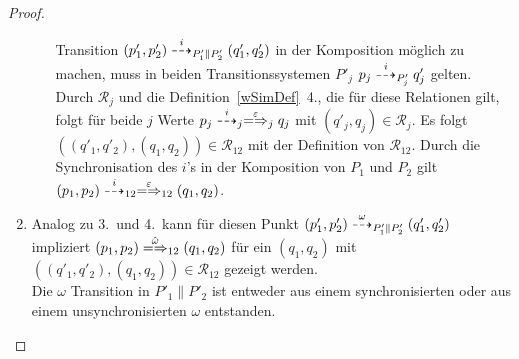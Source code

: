 \begin{proof}
\begin{enumerate}
\begin{itemize}
          Transition $(p'_1,p'_2)\may[i]_{P'_1\|P'_2}(q'_1,q'_2)$ in der
          Komposition möglich zu machen, muss in beiden Transitionssystemen
          $P'_j$ $p_j \may[i]_{P'_j} q'_j$ gelten. Durch $\mathcal{R}_j$ und
          die Definition~\ref{wSimDef}~4., die für diese Relationen gilt, folgt
          für beide $j$ Werte $p_j\may[i]_j \weakmay[\varepsilon]_j q_j$ mit
          $(q'_j,q_j)\in\mathcal{R}_j$. Es folgt $((q'_1,q'_2),(q_1,q_2)) \in
          \mathcal{R}_{12}$ mit der Definition von $\mathcal{R}_{12}$. Durch
          die Synchronisation des $i$'s in der Komposition von $P_1$ und $P_2$
          gilt $(p_1,p_2) \may[i]_{12} \weakmay[\varepsilon]_{12} (q_1,q_2)$.
      \end{itemize}
    \item Analog zu 3.\ und 4.\ kann für diesen Punkt $(p'_1,p'_2)
      \may[\omega]_{P'_1\|P'_2} (q'_1,q'_2)$ impliziert $(p_1,p_2)
      \weakmay[\hat{\omega}]_{12} (q_1,q_2)$ für ein $(q_1,q_2)$ mit
      $((q'_1,q'_2),(q_1,q_2))\in\mathcal{R}_{12}$ gezeigt werden.\\
      Die $\omega$ Transition in $P'_1\|P'_2$ ist entweder aus einem
      synchronisierten oder aus einem unsynchronisierten $\omega$ entstanden.
\end{enumerate}
\end{proof}
